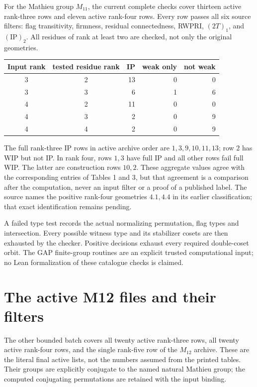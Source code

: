 \documentclass[11pt]{article}
\begin{document}
For the Mathieu group $M_{11}$, the current complete checks cover thirteen
active rank-three rows and eleven active rank-four rows. Every row passes
all six source filters: flag transitivity, firmness, residual connectedness,
RWPRI, $(2T)_1$, and $(\mathrm{IP})_2$. All residues of rank at least two
are checked, not only the original geometries.
\begin{center}
\begin{tabular}{ccrrr}\toprule
Input rank & tested residue rank & IP & weak only & not weak\\\midrule
3&2&13&0&0\\3&3&6&1&6\\
4&2&11&0&0\\4&3&2&0&9\\4&4&2&0&9\\\bottomrule
\end{tabular}
\end{center}
The full rank-three IP rows in active archive order are $1,3,9,10,11,13$;
row $2$ has WIP but not IP. In rank four, rows $1,3$ have full IP and
all other rows fail full WIP. The latter are construction rows $10,2$.
These aggregate values agree with the corresponding entries of Tables 1
and 3, but that agreement is a comparison after the computation, never
an input filter or a proof of a published label. The source names the
positive rank-four geometries $4.1,4.4$ in its earlier classification;
that exact identification remains pending.

A failed type test records the actual normalizing permutation, flag types
and intersection. Every possible witness type and its stabilizer cosets
are then exhausted by the checker. Positive decisions exhaust every
required double-coset orbit. The GAP finite-group routines are an explicit
trusted computational input; no Lean formalization of these catalogue
checks is claimed.

\section{The active M12 files and their filters}
The other bounded batch covers all twenty active rank-three rows, all
twenty active rank-four rows, and the single rank-five row of the
$M_{12}$ archive. These are the literal final active lists, not the
numbers assumed from the printed tables. Their groups are explicitly
conjugate to the named natural Mathieu group; the computed conjugating
permutations are retained with the input binding.
\end{document}

